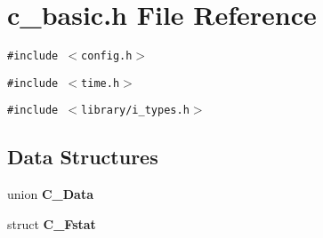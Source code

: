 \section{c\_\-basic.h File Reference}
\label{c__basic_8h}
{\tt \#include $<$config.h$>$}\par
{\tt \#include $<$time.h$>$}\par
{\tt \#include $<$library/i\_\-types.h$>$}\par
\subsection*{Data Structures}
\begin{CompactItemize}
\item 
union \bf{C\_\-Data}
\item 
struct \bf{C\_\-Fstat}
\end{CompactItemize}
